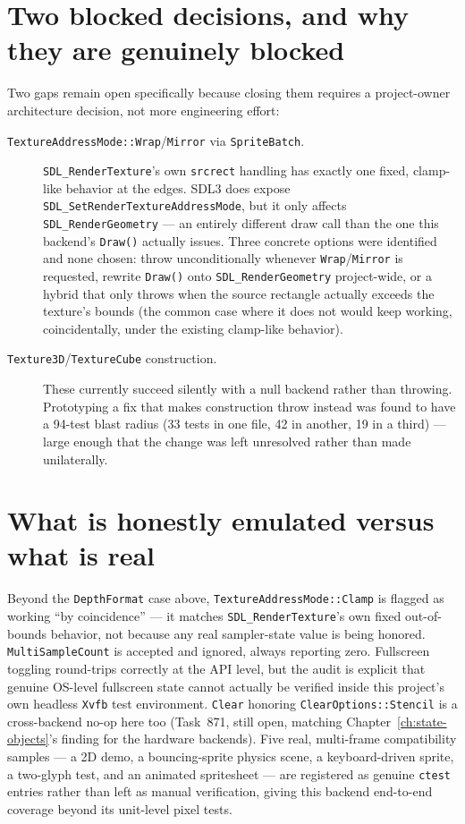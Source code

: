 \section{Two blocked decisions, and why they are genuinely blocked}

Two gaps remain open specifically because closing them requires a project-owner
architecture decision, not more engineering effort:

\begin{description}
  \item[\texttt{TextureAddressMode::Wrap}/\texttt{Mirror} via \texttt{SpriteBatch}.]
        \texttt{SDL\_RenderTexture}'s own \texttt{srcrect} handling has exactly one fixed,
        clamp-like behavior at the edges. SDL3 does expose
        \texttt{SDL\_SetRenderTextureAddressMode}, but it only affects
        \texttt{SDL\_RenderGeometry} --- an entirely different draw call than the one this
        backend's \texttt{Draw()} actually issues. Three concrete options were identified and
        none chosen: throw unconditionally whenever \texttt{Wrap}/\texttt{Mirror} is
        requested, rewrite \texttt{Draw()} onto \texttt{SDL\_RenderGeometry} project-wide, or
        a hybrid that only throws when the source rectangle actually exceeds the texture's
        bounds (the common case where it does not would keep working, coincidentally, under
        the existing clamp-like behavior).
  \item[\texttt{Texture3D}/\texttt{TextureCube} construction.] These currently succeed
        silently with a null backend rather than throwing. Prototyping a fix that makes
        construction throw instead was found to have a 94-test blast radius (33 tests in one
        file, 42 in another, 19 in a third) --- large enough that the change was left
        unresolved rather than made unilaterally.
\end{description}

\section{What is honestly emulated versus what is real}

Beyond the \texttt{DepthFormat} case above, \texttt{TextureAddressMode::Clamp} is flagged as
working ``by coincidence'' --- it matches \texttt{SDL\_RenderTexture}'s own fixed
out-of-bounds behavior, not because any real sampler-state value is being honored.
\texttt{MultiSampleCount} is accepted and ignored, always reporting zero. Fullscreen
toggling round-trips correctly at the API level, but the audit is explicit that genuine
OS-level fullscreen state cannot actually be verified inside this project's own headless
\texttt{Xvfb} test environment. \texttt{Clear} honoring \texttt{ClearOptions::Stencil} is a
cross-backend no-op here too (Task~871, still open, matching Chapter~\ref{ch:state-objects}'s
finding for the hardware backends). Five real, multi-frame compatibility samples --- a 2D
demo, a bouncing-sprite physics scene, a keyboard-driven sprite, a two-glyph
 test, and an animated spritesheet --- are registered as genuine
\texttt{ctest} entries rather than left as manual verification, giving this backend
end-to-end coverage beyond its unit-level pixel tests.


